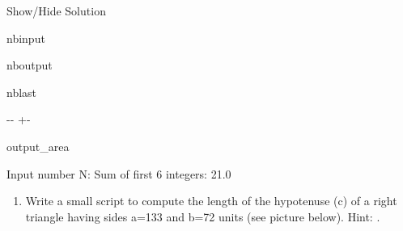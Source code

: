\documentclass[letterpaper,10pt,english]{sphinxmanual}
\begin{document}
\sphinxAtStartPar
Show/Hide Solution





\begin{sphinxuseclass}{nbinput}
{
\begin{sphinxVerbatim}[commandchars=\\\{\}]
\llap{\color{nbsphinxin}[23]:\,\hspace{\fboxrule}\hspace{\fboxsep}}
  
   
\end{sphinxVerbatim}
}

\end{sphinxuseclass}
\begin{sphinxuseclass}{nboutput}
\begin{sphinxuseclass}{nblast}
{

\kern-\sphinxverbatimsmallskipamount\kern-\baselineskip
\kern+\FrameHeightAdjust\kern-\fboxrule
\vspace{\nbsphinxcodecellspacing}

\begin{sphinxuseclass}{output_area}
\begin{sphinxuseclass}{}


\begin{sphinxVerbatim}[commandchars=\\\{\}]
Input number N:
Sum of first  6  integers:  21.0
\end{sphinxVerbatim}



\end{sphinxuseclass}
\end{sphinxuseclass}
}

\end{sphinxuseclass}
\end{sphinxuseclass}

\begin{enumerate}
%
\setcounter{enumi}{4}
\item {} 
\sphinxAtStartPar
Write a small script to compute the length of the hypotenuse (c) of a right triangle having sides a=133 and b=72 units (see picture below). Hint: .

\end{enumerate}
\end{document}
